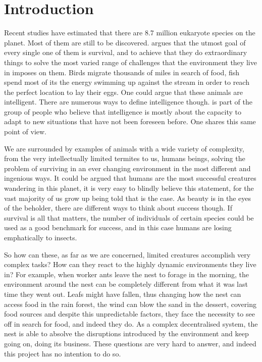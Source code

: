 \chapter{Introduction}
\label{ch:introduction}

Recent studies have estimated that there are $8.7$ million eukaryote species on the planet.\cite{10.1371/journal.pbio.1001127} \cite{10.1371/journal.pbio.1001130} Most of them are still to be discovered. \citeauthor{dawkins1990selfish} argues that the utmost goal of every single one of them is survival, and to achieve that they do extraordinary things to solve the most varied range of challenges that the environment they live in imposes on them. Birds migrate thousands of miles in search of food, fish spend most of its the energy swimming up against the stream in order to reach the perfect location to lay their eggs. One could argue that these animals are intelligent. There are numerous ways to define intelligence though. \citeauthor{kennedy2001swarm} is part of the group of people who believe that intelligence is mostly about the capacity to adapt to new situations that have not been foreseen before. \cite{kennedy2001swarm} One shares this same point of view.

We are surrounded by examples of animals with a wide variety of complexity, from the very intellectually limited termites to us, humans beings, solving the problem of surviving in an ever changing environment in the most different and ingenious ways. It could be argued that humans are the most successful creatures wandering in this planet, it is very easy to blindly believe this statement, for the vast majority of us grow up being told that is the case. As beauty is in the eyes of the beholder, there are different ways to think about success though. If survival is all that matters, the number of individuals of certain species could be used as a good benchmark for success, and in this case humans are losing emphatically to insects. \cite{MAY16091988}

So how can these, as far as we are concerned, limited creatures accomplish very complex tasks? How can they react to the highly dynamic environments they live in? For example, when worker ants leave the nest to forage in the morning, the environment around the nest can be completely different from what it was last time they went out. Leafs might have fallen, thus changing how the nest can access food in the rain forest, the wind can blow the sand in the dessert, covering food sources and despite this unpredictable factors, they face the necessity to see off in search for food, and indeed they do. As a complex decentralised system, the nest is able to absolve the disruptions introduced by the environment and keep going on, doing its business. These questions are very hard to answer, and indeed this project has no intention to do so. 
 
